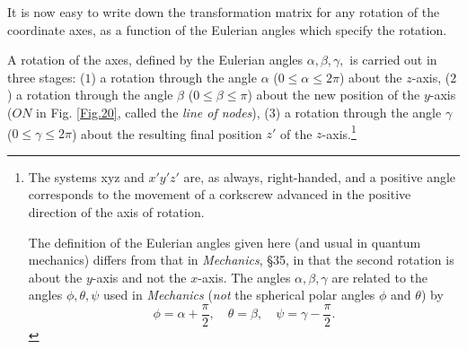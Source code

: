 It is now easy to write down the transformation matrix for any rotation of the coordinate axes, as a function of the Eulerian angles which specify the rotation.

A rotation of the axes, defined by the Eulerian angles $ \alpha,\beta,\gamma, $ is carried out in three stages: ($ 1 $) a rotation through the angle $\alpha$ ($ 0 \leqslant\alpha\leqslant2\pi $) about the $ z $-axis, ($ 2 $) a rotation through the angle $ \beta $ ($ 0\leqslant\beta\leqslant\pi $) about the new position of the $ y $-axis ($ ON $ in Fig. \ref{Fig.20}, called the \textit{line of nodes}), ($ 3 $) a rotation through the angle $\gamma$ ($ 0\leqslant\gamma\leqslant2\pi $) about the resulting final position $ z' $ of the $ z $-axis.\footnote{The systems xyz and $ x'y'z' $ are, as always, right-handed, and a positive angle corresponds to the movement of a corkscrew advanced in the positive direction of the axis of rotation.
	
The definition of the Eulerian angles given here (and usual in quantum mechanics) differs from that in \textit{Mechanics}, \S35, in that the second rotation is about the $ y $-axis and not the $ x $-axis. The angles $ \alpha,\beta,\gamma $ are related to the angles $ \phi,\theta,\psi $ used in \textit{Mechanics} (\textit{not} the spherical polar angles $\phi$ and $\theta$) by 
\[ \phi=\alpha+\frac{\pi}{2},\quad\theta=\beta,\quad\psi=\gamma-\frac{\pi}{2}. \]
}
